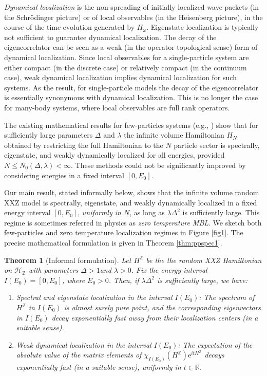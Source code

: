 \documentclass[12pt, a4paper,reqno]{amsart}
\numberwithin{equation}{section}
\newtheorem{theorem}{Theorem}[section]
\newcommand\R{\mathbb R}
\newcommand\Z{\mathbb Z}
\newcommand\e{\mathrm{e}}
\newcommand\cH{\mathcal{H}}
\begin{document}
{\it Dynamical localization} is the non-spreading of initially localized wave packets (in the Schr\"odinger picture) or of local observables (in the Heisenberg picture), in the course of the time evolution generated by $H_\omega$.  
Eigenstate localization is typically not sufficient to guarantee dynamical localization. The decay of the eigencorrelator can be seen as a weak (in the operator-topological sense) form of dynamical localization. Since local observables for a single-particle system are either compact (in the discrete case) or relatively compact (in the continuum case),  weak dynamical localization  implies dynamical localization for such systems. As the result, for single-particle models the decay of the eigencorrelator is essentially synonymous with dynamical localization. This is no longer the case for many-body systems, where local observables are full rank operators.

The existing mathematical results for few-particles systems (e.g.,  \cite{CS,AW2,KlN1,KlN2}) show that for sufficiently large parameters $\Delta$ and $\lambda$ the infinite volume Hamiltonian $H_N$ obtained by restricting the full Hamiltonian to the $N$ particle sector is spectrally, eigenstate,  and weakly dynamically localized for all energies, provided  $N\le N_0(\Delta,\lambda)<\infty$. These methods could not be significantly improved by considering energies in a fixed interval  $[0,E_0]$.

Our main result,  stated informally below,    shows that the infinite volume random XXZ model is spectrally, eigenstate, and weakly dynamically localized in a fixed energy interval $[0,E_0]$, {\it uniformly in $N$}, as long as $\lambda \Delta^2$ is sufficiently large.   This regime is sometimes referred in physics as  {\it zero temperature MBL}. We sketch both few-particles and zero temperature localization regimes in Figure \ref{fig1}.  The precise mathematical formulation is  given in Theorem \ref{thm:ppspec1}.


 \begin{theorem}[Informal formulation]\label{thm:ppspec}  
 Let $H^\Z$ be the  the  random XXZ Hamiltonian on $\cH_\Z$ with  parameters $\Delta>1$and $\lambda >0$. Fix the energy    interval $I(E_0)=[0,E_0]$, where $E_0>0$.   Then, if  $\lambda \Delta^2$ is sufficiently large, we have:
\begin{enumerate}
    \item   Spectral   and eigenstate  localization in the interval  $I(E_0)$:  The spectrum of $H^\Z$ in $I(E_0)$ is almost surely pure point, and the corresponding eigenvectors  in  $I(E_0)$ decay exponentially fast away from their localization centers (in a suitable sense).
%
\item  Weak dynamical localization in the interval $I(E_0)$:  The expectation of the absolute value of the   matrix elements of $\chi_{I(E_0)}(H^\Z)\e^{itH^\Z}$ decays exponentially fast (in a suitable sense), uniformly in $t\in \R$.
\end{enumerate}
\end{theorem} 
\end{document}
